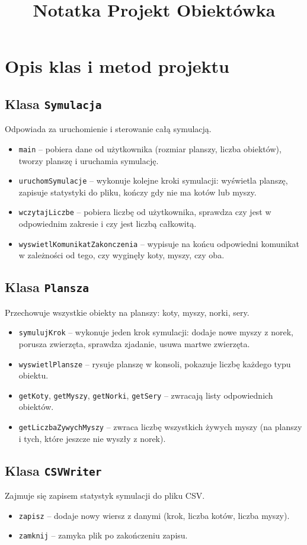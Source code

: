 \documentclass{article}
\title{Notatka Projekt Obiektówka}
\begin{document}
\section*{Opis klas i metod projektu}

\subsection*{Klasa \texttt{Symulacja}}
Odpowiada za uruchomienie i sterowanie całą symulacją.
\begin{itemize}

  \item \texttt{main} -- pobiera dane od użytkownika (rozmiar planszy, liczba obiektów), tworzy planszę i uruchamia symulację.
  \item \texttt{uruchomSymulacje} -- wykonuje kolejne kroki symulacji: wyświetla planszę, zapisuje statystyki do pliku, kończy gdy nie ma kotów lub myszy.
  \item \texttt{wczytajLiczbe} -- pobiera liczbę od użytkownika, sprawdza czy jest w odpowiednim zakresie i czy jest liczbą całkowitą.
  \item \texttt{wyswietlKomunikatZakonczenia} -- wypisuje na końcu odpowiedni komunikat w zależności od tego, czy wyginęły koty, myszy, czy oba.
\end{itemize}

\subsection*{Klasa \texttt{Plansza}}
Przechowuje wszystkie obiekty na planszy: koty, myszy, norki, sery.
\begin{itemize}
  \item \texttt{symulujKrok} -- wykonuje jeden krok symulacji: dodaje nowe myszy z norek, porusza zwierzęta, sprawdza zjadanie, usuwa martwe zwierzęta.
  \item \texttt{wyswietlPlansze} -- rysuje planszę w konsoli, pokazuje liczbę każdego typu obiektu.
  \item \texttt{getKoty}, \texttt{getMyszy}, \texttt{getNorki}, \texttt{getSery} -- zwracają listy odpowiednich obiektów.
  \item \texttt{getLiczbaZywychMyszy} -- zwraca liczbę wszystkich żywych myszy (na planszy i tych, które jeszcze nie wyszły z norek).
\end{itemize}

\subsection*{Klasa \texttt{CSVWriter}}
Zajmuje się zapisem statystyk symulacji do pliku CSV.
\begin{itemize}
  \item \texttt{zapisz} -- dodaje nowy wiersz z danymi (krok, liczba kotów, liczba myszy).
  \item \texttt{zamknij} -- zamyka plik po zakończeniu zapisu.
\end{itemize}
\end{document}
